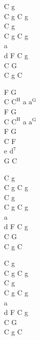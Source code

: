 \begin{chord}
    C g\\
    C g C g\\
    C g\\
    C g C g\\
    a\\
    d F C g\\
    C G\\
    C g C

    F G\\
    C $\mathrm{C^H}$ a $\mathrm{a^G}$\\
    F G\\
    C $\mathrm{C^H}$ a $\mathrm{a^G}$\\
    F G\\
    C F\\
    e $\mathrm{d^7}$\\
    G C

    C g\\
    C g C g\\
    C g\\
    C g C g\\
    a\\
    d F C g\\
    C G\\
    C g C

    C g\\
    C g C g\\
    C g\\
    C g C g\\
    a\\
    d F C g\\
    C G\\
    C g C
\end{chord}
